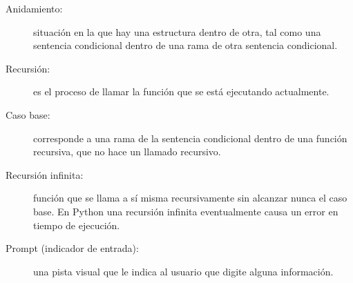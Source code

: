 \begin{description}
\item[Anidamiento:]  situación en la que hay una estructura dentro de otra,
tal como una sentencia  condicional dentro de una rama
de otra sentencia condicional.

\item[Recursión:]  es el proceso de llamar la función que se está
ejecutando actualmente.

\item[Caso base:]  corresponde a una rama de la sentencia  condicional dentro 
de una función recursiva, que no hace un llamado recursivo.

\item[Recursión infinita:]  función que se llama a sí misma
recursivamente sin alcanzar nunca el caso base. En Python una 
recursión infinita eventualmente causa un error en tiempo de
ejecución.

\item[Prompt (indicador de entrada):]  una pista visual que le indica al usuario que
digite alguna información.


\end{description}

